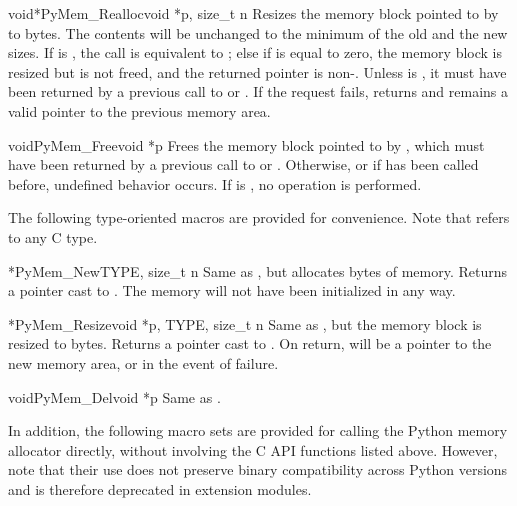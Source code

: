 \begin{cfuncdesc}{void*}{PyMem_Realloc}{void *p, size_t n}
  Resizes the memory block pointed to by  to  bytes.
  The contents will be unchanged to the minimum of the old and the new
  sizes. If  is \NULL, the call is equivalent to
  ; else if  is equal to zero, the
  memory block is resized but is not freed, and the returned pointer
  is non-\NULL.  Unless  is \NULL, it must have been
  returned by a previous call to  or
  . If the request fails,
   returns \NULL{} and  remains a
  valid pointer to the previous memory area.
\end{cfuncdesc}

\begin{cfuncdesc}{void}{PyMem_Free}{void *p}
  Frees the memory block pointed to by , which must have been
  returned by a previous call to  or
  .  Otherwise, or if
   has been called before, undefined
  behavior occurs. If  is \NULL, no operation is performed.
\end{cfuncdesc}

The following type-oriented macros are provided for convenience.  Note 
that  refers to any C type.

\begin{cfuncdesc}{*}{PyMem_New}{TYPE, size_t n}
  Same as , but allocates  bytes of memory.  Returns a pointer cast to
  .  The memory will not have been initialized in
  any way.
\end{cfuncdesc}

\begin{cfuncdesc}{*}{PyMem_Resize}{void *p, TYPE, size_t n}
  Same as , but the memory block is resized
  to  bytes.  Returns a pointer
  cast to . On return,  will be a pointer to
  the new memory area, or \NULL{} in the event of failure.
\end{cfuncdesc}

\begin{cfuncdesc}{void}{PyMem_Del}{void *p}
  Same as .
\end{cfuncdesc}

In addition, the following macro sets are provided for calling the
Python memory allocator directly, without involving the C API functions
listed above. However, note that their use does not preserve binary
compatibility across Python versions and is therefore deprecated in
extension modules.

